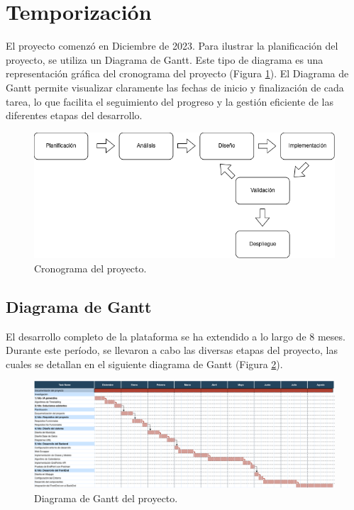 \section{Temporización}

El proyecto comenzó en Diciembre de 2023. Para ilustrar la planificación del proyecto, se utiliza un Diagrama de Gantt. Este tipo de diagrama es una representación gráfica del cronograma del proyecto (Figura \ref{fig:cronograma}). El Diagrama de Gantt permite visualizar claramente las fechas de inicio y finalización de cada tarea, lo que facilita el seguimiento del progreso y la gestión eficiente de las diferentes etapas del desarrollo.

\begin{figure}[H]
    \centering
    \includegraphics[width=1\textwidth]{imagenes/cronograma.png}
    \caption{Cronograma del proyecto.}
    \label{fig:cronograma}
\end{figure}

\subsection{Diagrama de Gantt}

El desarrollo completo de la plataforma se ha extendido a lo largo de 8 meses. Durante este período, se llevaron a cabo las diversas etapas del proyecto, las cuales se detallan en el siguiente diagrama de Gantt (Figura \ref{fig:gantt}).

\begin{landscape}
    \begin{figure}[H]
        \centering
        \includegraphics[width=1.65\textwidth]{imagenes/gantt.png}
        \caption{Diagrama de Gantt del proyecto.}
        \label{fig:gantt}
    \end{figure}    
\end{landscape}

